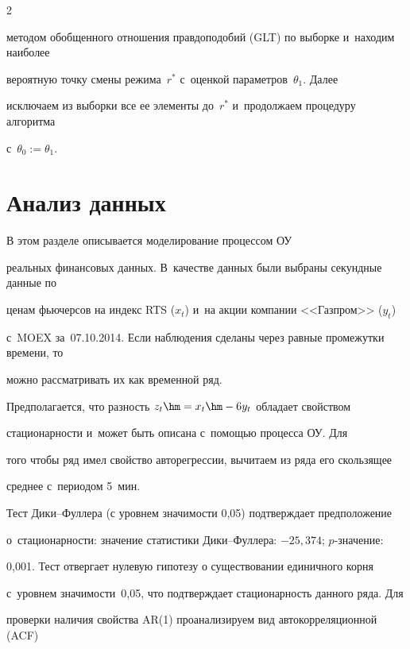 \begin{multicols}{2}
\begin{enumerate}[1.]
методом обобщенного отношения правдоподобий (GLT) по выборке и~находим наиболее 


вероятную точку смены режима~$r^*$ с~оценкой параметров~$\theta_1$. Далее 


исключаем из выборки все ее элементы до~$r^*$ и~продолжаем процедуру алгоритма 


с~$\theta_0:=\theta_1$.


\end{enumerate}








\section{Анализ данных}





       В этом разделе описывается моделирование процессом ОУ 


реальных финансовых данных. В~качестве данных были выбраны секундные данные по 


ценам фьючерсов на индекс RTS ($x_t$) и~на акции компании <<Газпром>> ($y_t$) 


с~MOEX за~07.10.2014. Если наблюдения сделаны через равные промежутки времени, то 


можно рассматривать их как временной ряд.


Предполагается, что разность $z_t \hm= x_t \hm - 6  y_t$ обладает свойством 


стационарности и~может быть описана с~помощью процесса ОУ. Для 


того чтобы ряд имел свойство авторегрессии, вычитаем из ряда его скользящее 


среднее с~периодом 5~мин.





Тест Дики--Фуллера (с уровнем зна\-чи\-мости 0,05) подтверждает предположение 


о~стационар\-ности: значение статистики Ди\-ки--Фул\-ле\-ра: $-25{,}374$; $p$-зна\-че\-ние: 


0,001. Тест  отвергает нулевую гипотезу о существовании единичного корня 


с~уровнем значимости~0,05, что подтверждает стационарность данного ряда.  Для 


проверки наличия свойства AR(1) проанализируем вид автокорреляционной (ACF) 



\end{multicols}
